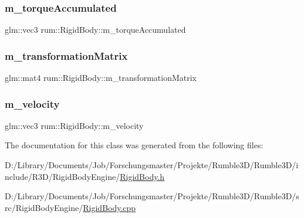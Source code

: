 \subsubsection{\texorpdfstring{m\+\_\+torque\+Accumulated}{m\_torqueAccumulated}}
{\footnotesize\ttfamily glm\+::vec3 rum\+::\+Rigid\+Body\+::m\+\_\+torque\+Accumulated\hspace{0.3cm}{\ttfamily [protected]}}

\mbox{\label{classrum_1_1_rigid_body_ad3a0b17141b70e55f03a713f3892100e}} 
\subsubsection{\texorpdfstring{m\+\_\+transformation\+Matrix}{m\_transformationMatrix}}
{\footnotesize\ttfamily glm\+::mat4 rum\+::\+Rigid\+Body\+::m\+\_\+transformation\+Matrix\hspace{0.3cm}{\ttfamily [protected]}}

\mbox{\label{classrum_1_1_rigid_body_a48ac9b6ee9e5b953e811b9d53b5152c4}} 
\subsubsection{\texorpdfstring{m\+\_\+velocity}{m\_velocity}}
{\footnotesize\ttfamily glm\+::vec3 rum\+::\+Rigid\+Body\+::m\+\_\+velocity\hspace{0.3cm}{\ttfamily [protected]}}



The documentation for this class was generated from the following files\+:\begin{DoxyCompactItemize}
\item 
D\+:/\+Library/\+Documents/\+Job/\+Forschungsmaster/\+Projekte/\+Rumble3\+D/\+Rumble3\+D/include/\+R3\+D/\+Rigid\+Body\+Engine/\mbox{\hyperlink{_rigid_body_8h}{Rigid\+Body.\+h}}\item 
D\+:/\+Library/\+Documents/\+Job/\+Forschungsmaster/\+Projekte/\+Rumble3\+D/\+Rumble3\+D/src/\+Rigid\+Body\+Engine/\mbox{\hyperlink{_rigid_body_8cpp}{Rigid\+Body.\+cpp}}\end{DoxyCompactItemize}
